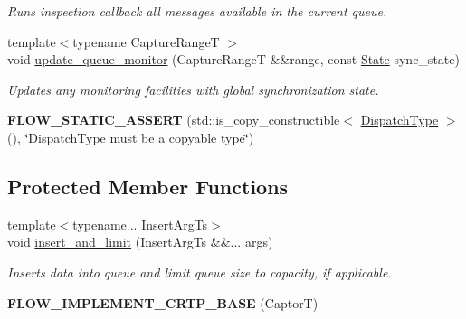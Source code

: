 \begin{DoxyCompactItemize}
\begin{DoxyCompactList}\small\item\em Runs inspection callback all messages available in the current queue. \end{DoxyCompactList}\item 
{\footnotesize template$<$typename Capture\+RangeT $>$ }\\void \hyperlink{classflow_1_1_captor_interface_aed9ad6819bfbcdda915febb57274842e}{update\+\_\+queue\+\_\+monitor} (Capture\+RangeT \&\&range, const \hyperlink{namespaceflow_adefe9726e597eb50c46f0f6a202018e9}{State} sync\+\_\+state)
\begin{DoxyCompactList}\small\item\em Updates any monitoring facilities with global synchronization state. \end{DoxyCompactList}\item 
\mbox{\label{classflow_1_1_captor_interface_a54c7551c6796e2b8d0ea500eab2c2af2}} 
{\bfseries F\+L\+O\+W\+\_\+\+S\+T\+A\+T\+I\+C\+\_\+\+A\+S\+S\+E\+RT} (std\+::is\+\_\+copy\+\_\+constructible$<$ \hyperlink{classflow_1_1_captor_interface_ae1eafeb6cd50f4a50843b963c232720a}{Dispatch\+Type} $>$(), \char`\"{}\textquotesingle{}Dispatch\+Type\textquotesingle{} must be a copyable type\char`\"{})
\end{DoxyCompactItemize}
\subsection*{Protected Member Functions}
\begin{DoxyCompactItemize}
\item 
{\footnotesize template$<$typename... Insert\+Arg\+Ts$>$ }\\void \hyperlink{classflow_1_1_captor_interface_ab1add272b1b90192edb6c567847140e7}{insert\+\_\+and\+\_\+limit} (Insert\+Arg\+Ts \&\&... args)
\begin{DoxyCompactList}\small\item\em Inserts data into queue and limit queue size to capacity, if applicable. \end{DoxyCompactList}\item 
\mbox{\label{classflow_1_1_captor_interface_ab7fafe6cdc7d20696c6751e507a252a9}} 
{\bfseries F\+L\+O\+W\+\_\+\+I\+M\+P\+L\+E\+M\+E\+N\+T\+\_\+\+C\+R\+T\+P\+\_\+\+B\+A\+SE} (CaptorT)
\end{DoxyCompactItemize}
